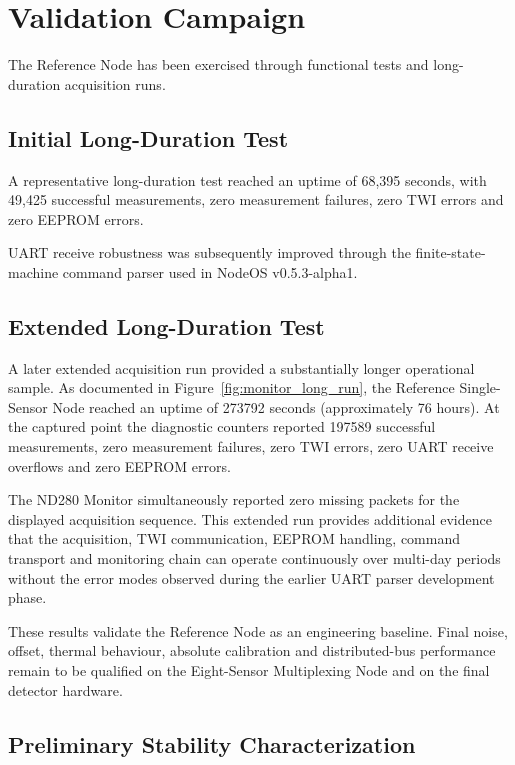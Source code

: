 \chapter{Validation Campaign}

The Reference Node has been exercised through functional tests and long-duration acquisition runs.

\section{Initial Long-Duration Test}

A representative long-duration test reached an uptime of 68,395 seconds, with 49,425 successful measurements, zero measurement failures, zero TWI errors and zero EEPROM errors.

UART receive robustness was subsequently improved through the finite-state-machine command parser used in NodeOS v0.5.3-alpha1.

\section{Extended Long-Duration Test}

A later extended acquisition run provided a substantially longer operational sample. As documented in Figure~\ref{fig:monitor_long_run}, the Reference Single-Sensor Node reached an uptime of 273792 seconds (approximately 76 hours). At the captured point the diagnostic counters reported 197589 successful measurements, zero measurement failures, zero TWI errors, zero UART receive overflows and zero EEPROM errors.

The ND280 Monitor simultaneously reported zero missing packets for the displayed acquisition sequence. This extended run provides additional evidence that the acquisition, TWI communication, EEPROM handling, command transport and monitoring chain can operate continuously over multi-day periods without the error modes observed during the earlier UART parser development phase.

These results validate the Reference Node as an engineering baseline. Final noise, offset, thermal behaviour, absolute calibration and distributed-bus performance remain to be qualified on the Eight-Sensor Multiplexing Node and on the final detector hardware.


\section{Preliminary Stability Characterization}
\label{sec:preliminary_stability}

